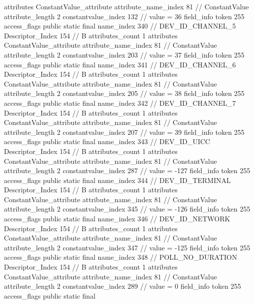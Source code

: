 {{{{{				attributes {
				ConstantValue_attribute {
					attribute_name_index	81		// ConstantValue
					attribute_length	2
					constantvalue_index	132		// value = 36
				}
				}
			}
			field_info {
				token	255
				access_flags	public static final
				name_index	340		// DEV_ID_CHANNEL_5
				Descriptor_Index	154		// B
				attributes_count	1
				attributes {
				ConstantValue_attribute {
					attribute_name_index	81		// ConstantValue
					attribute_length	2
					constantvalue_index	203		// value = 37
				}
				}
			}
			field_info {
				token	255
				access_flags	public static final
				name_index	341		// DEV_ID_CHANNEL_6
				Descriptor_Index	154		// B
				attributes_count	1
				attributes {
				ConstantValue_attribute {
					attribute_name_index	81		// ConstantValue
					attribute_length	2
					constantvalue_index	205		// value = 38
				}
				}
			}
			field_info {
				token	255
				access_flags	public static final
				name_index	342		// DEV_ID_CHANNEL_7
				Descriptor_Index	154		// B
				attributes_count	1
				attributes {
				ConstantValue_attribute {
					attribute_name_index	81		// ConstantValue
					attribute_length	2
					constantvalue_index	207		// value = 39
				}
				}
			}
			field_info {
				token	255
				access_flags	public static final
				name_index	343		// DEV_ID_UICC
				Descriptor_Index	154		// B
				attributes_count	1
				attributes {
				ConstantValue_attribute {
					attribute_name_index	81		// ConstantValue
					attribute_length	2
					constantvalue_index	287		// value = -127
				}
				}
			}
			field_info {
				token	255
				access_flags	public static final
				name_index	344		// DEV_ID_TERMINAL
				Descriptor_Index	154		// B
				attributes_count	1
				attributes {
				ConstantValue_attribute {
					attribute_name_index	81		// ConstantValue
					attribute_length	2
					constantvalue_index	345		// value = -126
				}
				}
			}
			field_info {
				token	255
				access_flags	public static final
				name_index	346		// DEV_ID_NETWORK
				Descriptor_Index	154		// B
				attributes_count	1
				attributes {
				ConstantValue_attribute {
					attribute_name_index	81		// ConstantValue
					attribute_length	2
					constantvalue_index	347		// value = -125
				}
				}
			}
			field_info {
				token	255
				access_flags	public static final
				name_index	348		// POLL_NO_DURATION
				Descriptor_Index	154		// B
				attributes_count	1
				attributes {
				ConstantValue_attribute {
					attribute_name_index	81		// ConstantValue
					attribute_length	2
					constantvalue_index	289		// value = 0
				}
				}
			}
			field_info {
				token	255
				access_flags	public static final
}}}}}
